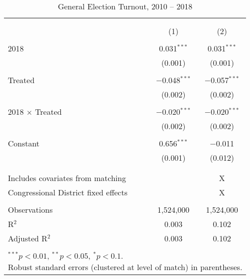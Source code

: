 \begin{table}[H] \centering
\caption{\label{tab:oldies} General Election Turnout, 2010 {--} 2018}
\label{}
\small
\begin{tabular}{@{\extracolsep{5pt}}lcc}
\\[-1.8ex]\hline \\[-1.8ex]
\\[-1.8ex] & (1) & (2)\\
\hline \\[-1.8ex]
2018 & 0.031$^{***}$ & 0.031$^{***}$ \\
& (0.001) & (0.001) \\
& & \\
Treated & $-$0.048$^{***}$ & $-$0.057$^{***}$ \\
& (0.002) & (0.002) \\
& & \\
2018 $\times$ Treated & $-$0.020$^{***}$ & $-$0.020$^{***}$ \\
& (0.002) & (0.002) \\
& & \\
Constant & 0.656$^{***}$ & $-$0.011 \\
& (0.001) & (0.012) \\
& & \\
\hline \\[-1.8ex]
Includes covariates from matching &  & X \\
Congressional District fixed effects &  & X \\
\hline \\[-1.8ex]
Observations & 1,524,000 & 1,524,000 \\
R$^{2}$ & 0.003 & 0.102 \\
Adjusted R$^{2}$ & 0.003 & 0.102 \\
\hline \\[-1.8ex]
\multicolumn{3}{l}{\scriptsize{\parbox{.5\linewidth}{\vspace{2pt}$^{***}p<0.01$, $^{**}p<0.05$, $^*p<0.1$. \\Robust standard errors (clustered at level of match) in parentheses.}}}
\end{tabular}
\end{table}
